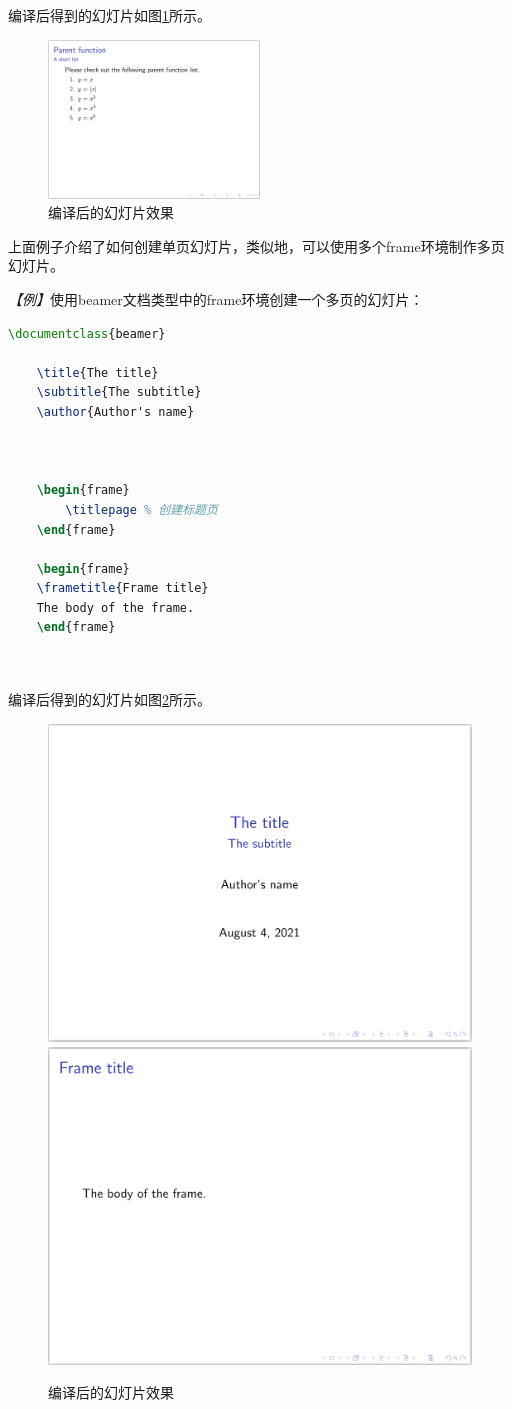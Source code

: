 编译后得到的幻灯片如图\ref{fig:904}所示。

\begin{figure}[htbp]
    \centering
    \includegraphics[width = 0.5\textwidth]{images/ch_9/example4.png}
    \caption{编译后的幻灯片效果}
    \label{fig:904}
\end{figure}

上面例子介绍了如何创建单页幻灯片，类似地，可以使用多个frame环境制作多页幻灯片。

\emph{【例】}使用beamer文档类型中的frame环境创建一个多页的幻灯片：
\begin{lstlisting}[language=TeX]
    \documentclass{beamer}

    \title{The title}
    \subtitle{The subtitle}
    \author{Author's name}

    

    \begin{frame}
        \titlepage % 创建标题页
    \end{frame}

    \begin{frame}
    \frametitle{Frame title}
    The body of the frame.
    \end{frame}

    
\end{lstlisting}

编译后得到的幻灯片如图\ref{fig:905}所示。

\begin{figure}[htbp]
    \centering
    \includegraphics[width = 0.45\linewidth]{images/ch_9/example5_1.png}
    \includegraphics[width = 0.45\linewidth]{images/ch_9/example5_2.png}
    \caption{编译后的幻灯片效果}
    \label{fig:905}
\end{figure}

